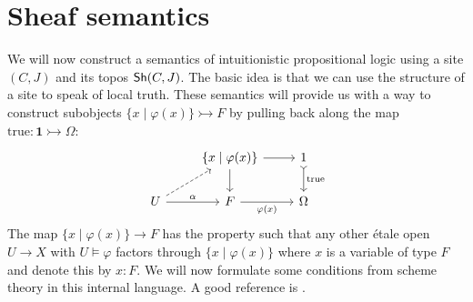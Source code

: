 \section{Sheaf semantics}
We will now construct a semantics of intuitionistic propositional logic using a site $(C,J)$ and its topos $\operatorname{\mathsf{Sh}}(C,J)$. The basic idea is that we can use the structure of a site to speak of local truth. These semantics will provide us with a way to construct subobjects $\{x \mid \varphi(x) \} \rightarrowtail
	F$ by pulling back along the map $\text{true}: \mathbf{1} \rightarrowtail \Omega$:
\[\begin{tikzcd}
		& {\{x  \mid \varphi(x)\}} & 1 \\
		U & F & \Omega
		\arrow[from=1-2, to=1-3]
		\arrow[from=1-2, to=2-2]
		\arrow["{\varphi(x)}"', from=2-2, to=2-3]
		\arrow["\text{true}", tail, from=1-3, to=2-3]
		\arrow[dashed, from=2-1, to=1-2]
		\arrow["\alpha", from=2-1, to=2-2]
	\end{tikzcd}\]
The map $\{ x \mid \varphi(x) \} \to F$ has the property such that any other \'etale open $U \to X$ with $U \vDash \varphi$ factors through $\{x \mid \varphi(x) \}$ where $x$ is a variable of type $F$ and denote this by $x \colon F$. We will now formulate some conditions from scheme theory in this internal language. A good reference is \cite{Blechschmidt}.

